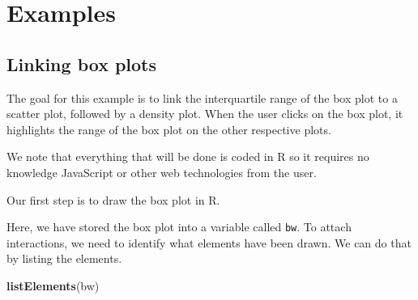 \documentclass[11pt,]{report}
\newenvironment{Shaded}{\begin{snugshade}}{\end{snugshade}}
\newcommand{\KeywordTok}[1]{\textcolor[rgb]{0.13,0.29,0.53}{\textbf{#1}}}
\newcommand{\DataTypeTok}[1]{\textcolor[rgb]{0.13,0.29,0.53}{#1}}
\newcommand{\StringTok}[1]{\textcolor[rgb]{0.31,0.60,0.02}{#1}}
\newcommand{\OperatorTok}[1]{\textcolor[rgb]{0.81,0.36,0.00}{\textbf{#1}}}
\newcommand{\NormalTok}[1]{#1}
\begin{document}
\section{Examples}\label{examples}

\subsection{Linking box plots}\label{linking-box-plots}

The goal for this example is to link the interquartile range of the box
plot to a scatter plot, followed by a density plot. When the user clicks
on the box plot, it highlights the range of the box plot on the other
respective plots.

We note that everything that will be done is coded in R so it requires
no knowledge JavaScript or other web technologies from the user.

Our first step is to draw the box plot in R.

\begin{Shaded}
\end{Shaded}

Here, we have stored the box plot into a variable called \texttt{bw}. To
attach interactions, we need to identify what elements have been drawn.
We can do that by listing the elements.

\begin{Shaded}
\begin{Highlighting}[]
\KeywordTok{listElements}\NormalTok{(bw)}
\end{Highlighting}
\end{Shaded}
\end{document}
